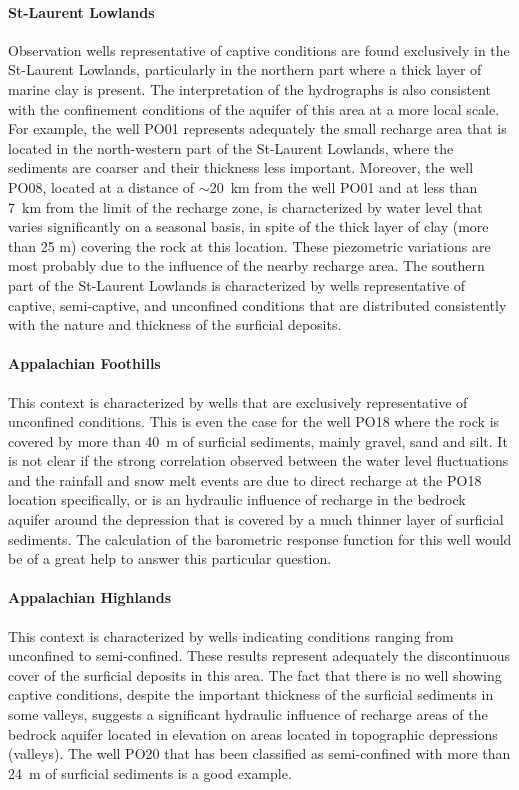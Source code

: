 \documentclass[WHATMANUAL.tex]{subfiles}
\begin{document}
\paragraph{St-Laurent Lowlands} Observation wells representative of captive conditions are found exclusively in the St-Laurent Lowlands, particularly in the northern part where a thick layer of marine clay is present. The interpretation of the hydrographs is also consistent with the confinement conditions of the aquifer of this area at a more local scale. For example, the well PO01 represents adequately the small recharge area that is located in the north-western part of the St-Laurent Lowlands, where the sediments are coarser and their thickness less important. Moreover, the well PO08, located at a distance of $\sim$20~km from the well PO01 and at less than 7~km from the limit of the recharge zone, is characterized by water level that varies significantly on a seasonal basis, in spite of the thick layer of clay (more than 25 m) covering the rock at this location. These piezometric variations are most probably due to the influence of the nearby recharge area. The southern part of the St-Laurent Lowlands is characterized by wells representative of captive, semi-captive, and unconfined conditions that are distributed consistently with the nature and thickness of the surficial deposits.

\paragraph{Appalachian Foothills} This context is characterized by wells that are exclusively representative of unconfined conditions. This is even the case for the well PO18 where the rock is covered by more than 40~m of surficial sediments, mainly gravel, sand and silt. It is not clear if the strong correlation observed between the water level fluctuations and the rainfall and snow melt events are due to direct recharge at the PO18 location specifically, or is an hydraulic influence of recharge in the bedrock aquifer around the depression that is covered by a much thinner layer of surficial sediments. The calculation of the barometric response function for this well would be of a great help to answer this particular question.

\paragraph{Appalachian Highlands} This context is characterized by wells indicating conditions ranging from unconfined to semi-confined. These results represent adequately the discontinuous cover of the surficial deposits in this area. The fact that there is no well showing captive conditions, despite the important thickness of the surficial sediments in some valleys, suggests a significant hydraulic influence of recharge areas of the bedrock aquifer located in elevation on areas located in topographic depressions (valleys). The well PO20 that has been classified as semi-confined with more than 24~m of surficial sediments is a good example.
\end{document}
